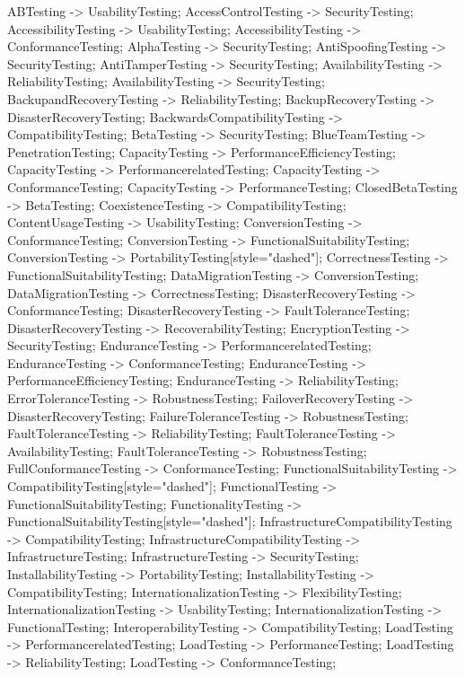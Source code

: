\documentclass{article}
\begin{document}
{ABTesting -> UsabilityTesting;
AccessControlTesting -> SecurityTesting;
AccessibilityTesting -> UsabilityTesting;
AccessibilityTesting -> ConformanceTesting;
AlphaTesting -> SecurityTesting;
AntiSpoofingTesting -> SecurityTesting;
AntiTamperTesting -> SecurityTesting;
AvailabilityTesting -> ReliabilityTesting;
AvailabilityTesting -> SecurityTesting;
BackupandRecoveryTesting -> ReliabilityTesting;
BackupRecoveryTesting -> DisasterRecoveryTesting;
BackwardsCompatibilityTesting -> CompatibilityTesting;
BetaTesting -> SecurityTesting;
BlueTeamTesting -> PenetrationTesting;
CapacityTesting -> PerformanceEfficiencyTesting;
CapacityTesting -> PerformancerelatedTesting;
CapacityTesting -> ConformanceTesting;
CapacityTesting -> PerformanceTesting;
ClosedBetaTesting -> BetaTesting;
CoexistenceTesting -> CompatibilityTesting;
ContentUsageTesting -> UsabilityTesting;
ConversionTesting -> ConformanceTesting;
ConversionTesting -> FunctionalSuitabilityTesting;
ConversionTesting -> PortabilityTesting[style="dashed"];
CorrectnessTesting -> FunctionalSuitabilityTesting;
DataMigrationTesting -> ConversionTesting;
DataMigrationTesting -> CorrectnessTesting;
DisasterRecoveryTesting -> ConformanceTesting;
DisasterRecoveryTesting -> FaultToleranceTesting;
DisasterRecoveryTesting -> RecoverabilityTesting;
EncryptionTesting -> SecurityTesting;
EnduranceTesting -> PerformancerelatedTesting;
EnduranceTesting -> ConformanceTesting;
EnduranceTesting -> PerformanceEfficiencyTesting;
EnduranceTesting -> ReliabilityTesting;
ErrorToleranceTesting -> RobustnessTesting;
FailoverRecoveryTesting -> DisasterRecoveryTesting;
FailureToleranceTesting -> RobustnessTesting;
FaultToleranceTesting -> ReliabilityTesting;
FaultToleranceTesting -> AvailabilityTesting;
FaultToleranceTesting -> RobustnessTesting;
FullConformanceTesting -> ConformanceTesting;
FunctionalSuitabilityTesting -> CompatibilityTesting[style="dashed"];
FunctionalTesting -> FunctionalSuitabilityTesting;
FunctionalityTesting -> FunctionalSuitabilityTesting[style="dashed"];
InfrastructureCompatibilityTesting -> CompatibilityTesting;
InfrastructureCompatibilityTesting -> InfrastructureTesting;
InfrastructureTesting -> SecurityTesting;
InstallabilityTesting -> PortabilityTesting;
InstallabilityTesting -> CompatibilityTesting;
InternationalizationTesting -> FlexibilityTesting;
InternationalizationTesting -> UsabilityTesting;
InternationalizationTesting -> FunctionalTesting;
InteroperabilityTesting -> CompatibilityTesting;
LoadTesting -> PerformancerelatedTesting;
LoadTesting -> PerformanceTesting;
LoadTesting -> ReliabilityTesting;
LoadTesting -> ConformanceTesting;
}
\end{document}
